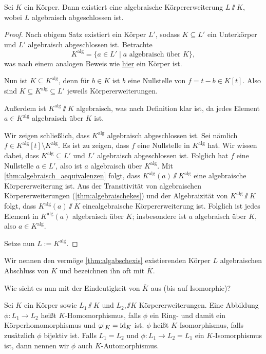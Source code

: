 \documentclass[12pt,a4paper]{scrartcl}
\begin{document}
\begin{satz}\label{thm:algabschexis}
	Sei $K$ ein Körper. Dann existiert eine algebraische Körpererweiterung $L\sslash K$, wobei $L$ algebraisch abgeschlossen ist.
\end{satz}
\begin{proof}
	Nach obigem Satz existiert ein Körper $L'$, sodass $K\subseteq L'$ ein Unterkörper und $L'$ algebraisch abgeschlossen ist. Betrachte
	\[K^{\text{alg}} = \{a\in L' \mid a\text{ algebraisch über } K\},\]
	was nach einem analogen Beweis wie \hyperref[enumi:IQalgkoerp]{hier} ein Körper ist.
	
	Nun ist $K\subseteq K^{\text{alg}}$, denn für $b\in K$ ist $b$ eine Nullstelle von $f = t-b\in K[t]$. Also sind $K\subseteq K^{\text{alg}}\subseteq L'$ jeweils Körpererweiterungen.
	
	Außerdem ist $K^{\text{alg}}\sslash K$ algebraisch, was nach Definition klar ist, da jedes Element $a\in K^{\text{alg}}$ algebraisch über $K$ ist.
	
	Wir zeigen schließlich, dass $K^{\text{alg}}$ algebraisch abgeschlossen ist. Sei nämlich $f\in K^{\text{alg}}[t]\setminus K^{\text{alg}}$. Es ist zu zeigen, dass $f$ eine Nullstelle in $K^{\text{alg}}$ hat. Wir wissen dabei, dass $K^{\text{alg}}\subseteq L'$ und $L'$ algebraisch abgeschlossen ist. Folglich hat $f$ eine Nullstelle $a\in L'$, also ist $a$ algebraisch über $K^{\text{alg}}$. Mit \cref{thm:algebraisch_aequivalenzen} folgt, dass $K^{\text{alg}}(a)\sslash K^{\text{alg}}$ eine algebraische Körpererweiterung ist. Aus der Transitivität von algebraischen Körpererweiterungen (\cref{thm:algebraischekes}) und der Algebraizität von $K^{\text{alg}}\sslash K$ folgt, dass $K^{\text{alg}}(a)\sslash K$  einealgebraische Körpererweiterung ist. Folglich ist jedes Element in $K^{\text{alg}}(a)$ algebraisch über $K$; insbesondere ist $a$ algebraisch über $K$, also $a\in K^{\text{alg}}$.
	
	Setze nun $L:= K^{\text{alg}}$.
\end{proof}

\begin{defi}
	Wir nennen den vermöge \cref{thm:algabschexis} existierenden Körper $L$ algebraischen Abschluss von $K$ und bezeichnen ihn oft mit $\overline{K}$.
\end{defi}
Wie sieht es nun mit der Eindeutigkeit von $\overline{K}$ aus (bis auf Isomorphie)?
\begin{defi}
	Sei $K$ ein Körper sowie $L_1\sslash K$ und $L_2, \sslash K$ Körpererweiterungen. Eine Abbildung $\phi\colon L_1\to L_2$ heißt $K$-Homomorphismus, falls $\phi$ ein Ring- und damit ein Körperhomomorphismus und $\varphi|_K = \operatorname{id}_K$ ist. $\phi$ heißt $K$-Isomorphismus, falls zusätzlich $\phi$ bijektiv ist. Falls $L_1 = L_2$ und $\phi\colon L_1\to L_2 = L_1$ ein $K$-Isomorphismus ist, dann nennen wir $\phi$ auch $K$-Automorphismus.
\end{defi}
\end{document}
